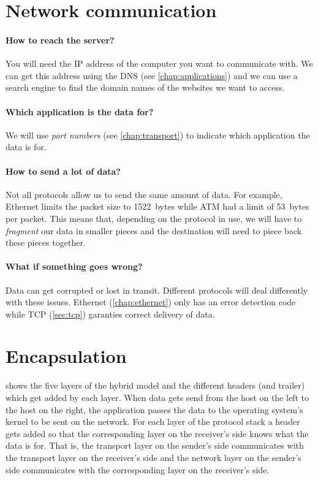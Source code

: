\section{Network communication}
\label{sec:network-communication}

\paragraph{How to reach the server?}
You will need the \acs{IP} address of the computer you want to communicate with.
We can get this address using the \acl{DNS} (see \vref{chap:applications}) and we can use a search engine to find the domain names of the websites we want to access.


\paragraph{Which application is the data for?}
We will use \emph{port numbers} (see \vref{chap:transport}) to indicate which application the data is for.


\paragraph{How to send a lot of data?}
Not all protocols allow us to send the same amount of data.
For example, Ethernet limits the packet size to 1522~bytes while \gls{ATM} had a limit of 53~bytes per packet.
This means that, depending on the protocol in use, we will have to \emph{fragment} our data in smaller pieces and the destination will need to piece back these pieces together.


\paragraph{What if something goes wrong?}
Data can get corrupted or lost in transit.
Different protocols will deal differently with these issues.
Ethernet (\vref{chap:ethernet}) only has an error detection code while \acf{TCP} (\vref{sec:tcp}) garanties correct delivery of data.


\section{Encapsulation}
\label{sec:encapsulation}

 shows the five layers of the hybrid model and the different headers (and trailer) which get added by each layer.
When data gets send from the host on the left to the host on the right, the application passes the data to the operating system's kernel to be sent on the network.
For each layer of the protocol stack a header gets added so that the corresponding layer on the receiver's side knows what the data is for.
That is, the transport layer on the sender's side communicates with the transport layer on the receiver's side and the network layer on the sender's side communicates with the corresponding layer on the receiver's side.

